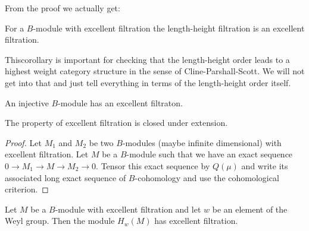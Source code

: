 From the proof we actually get:

\begin{corollary}\label{chap3-coro3.2.8}
For a $B$-module with excellent filtration the length-height
filtration is an excellent filtration. 
\end{corollary}

This\pageoriginale corollary\label{page31} is important for checking that the
length-height order leads to a highest weight category structure in
the sense of Cline-Parshall-Scott. We will not get into that and just
tell everything in terms of the length-height order itself.

\begin{corollary}\label{chap3-coro3.2.9}
An injective $B$-module has an excellent filtraton.
\end{corollary}

\begin{corollary}\label{chap3-coro3.2.10}
The property of excellent filtration is closed under extension.
\end{corollary}

\begin{proof}
Let $M_{1}$ and $M_{2}$ be two $B$-modules (maybe infinite
dimensional) with excellent filtration. Let $M$ be a $B$-module such
that we have an exact sequence $0\to M_{1}\to M\to M_{2}\to 0$. Tensor
this exact sequence by $Q(\mu)$ and write its associated long exact
sequence of $B$-cohomology and use the cohomological criterion.
\end{proof}

\begin{lemma}\label{chap3-lem3.2.11}
Let $M$ be a $B$-module with excellent filtration and let $w$ be an
element of the Weyl group. Then the module $H_{w}(M)$ has excellent
filtration. 
\end{lemma}

